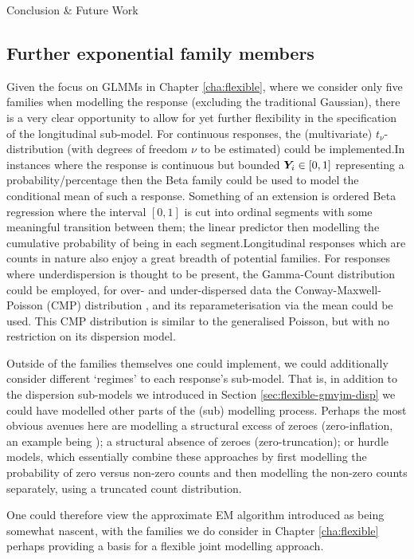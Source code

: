 \begin{chapter}{\label{cha:conclusion}Conclusion \& Future Work}
\subsection{Further exponential family members}\label{sec:conclusion-future-families}
Given the focus on GLMMs in Chapter \ref{cha:flexible}, where we consider only five families when modelling the response (excluding the traditional Gaussian), there is a very clear opportunity to allow for yet further flexibility in the specification of the longitudinal sub-model. For continuous responses, the (multivariate) $t_\nu$-distribution (with degrees of freedom $\nu$ to be estimated) could be implemented.\newline In instances where the response is continuous but bounded $\bm{Y}_i\in[0,1]$ \eg representing a probability/percentage then the Beta family could be used to model the conditional mean of such a response. Something of an extension is ordered Beta regression \citep{Ordbetareg} where the interval $[0,1]$ is cut into ordinal segments with some meaningful transition between them; the linear predictor then modelling the cumulative probability of being in each segment.\newline Longitudinal responses which are counts in nature also enjoy a great breadth of potential families. For responses where underdispersion is thought to be present, the Gamma-Count distribution \citep{GammaCount} could be employed, for over- and under-dispersed data the Conway-Maxwell-Poisson (CMP) distribution \citep{ConwayMaxwell, Shmueli2005}, and its reparameterisation via the mean \citep{Huang2017} could be used. This CMP distribution is similar to the generalised Poisson, but with no restriction on its dispersion model.

Outside of the families themselves one could implement, we could additionally consider different `regimes' to each response's sub-model. That is, in addition to the dispersion sub-models we introduced in Section \ref{sec:flexible-gmvjm-disp} we could have modelled other parts of the (sub) modelling process. Perhaps the most obvious avenues here are modelling a structural excess of zeroes (zero-inflation, an example being \citet{Zhu2018}); a structural absence of zeroes (zero-truncation); or hurdle models, which essentially combine these approaches by first modelling the probability of zero versus non-zero counts and then modelling the non-zero counts separately, using a truncated count distribution.

One could therefore view the approximate EM algorithm introduced as being somewhat nascent, with the families we do consider in Chapter \ref{cha:flexible} perhaps providing a basis for a flexible joint modelling approach.


\end{chapter}
